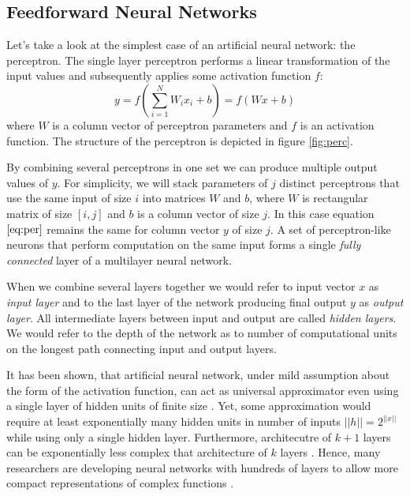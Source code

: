 \subsection{Feedforward Neural Networks}
\label{ch:ffnn}

Let's take a look at the simplest case of an artificial neural network: the perceptron.
The single layer perceptron performs a linear transformation of the input values and subsequently applies some activation function $f$:
\begin{equation}\label{eq:per}
  y = f(\sum_{i=1}^N W_ix_i + b) = f(Wx+b)
\end{equation}
where $W$ is a column vector of perceptron parameters and $f$ is an activation function. The structure of the perceptron is depicted in figure \ref{fig:perc}.



By combining several perceptrons in one set we can produce multiple output values of $y$.
For simplicity, we will stack parameters of $j$ distinct perceptrons that use the same input of size $i$ into matrices $W$ and $b$, where $W$ is rectangular matrix of size $[i,j]$ and $b$ is a column vector of size $j$.
In this case equation $\ref{eq:per}$ remains the same for column vector $y$ of size $j$. A set of perceptron-like neurons that perform computation on the same input forms a single \textit{fully connected} layer of a multilayer neural network.

When we combine several layers together we would refer to input vector $x$ as \textit{input layer} and to the last layer of the network producing final output $y$ as \textit{output layer}. All intermediate layers between input and output are called \textit{hidden layers}. We would refer to the depth of the network as to number of computational units on the longest path connecting input and output layers.

It has been shown, that artificial neural network, under mild assumption about the form of the activation function, can act as universal approximator even using a single layer of hidden units of finite size \cite{Debao1993}. Yet, some approximation would require at least exponentially many hidden units in number of inputs $||h||=2^{||x||}$ \cite{Pascanu2014} while using only a single hidden layer. Furthermore, architecutre of $k+1$ layers can be exponentially less complex that architecture of $k$ layers \cite{Bengio2009a}.
Hence, many researchers are developing neural networks with hundreds of layers to allow more compact representations of complex functions \cite{He2015, Srivastava2015}.

